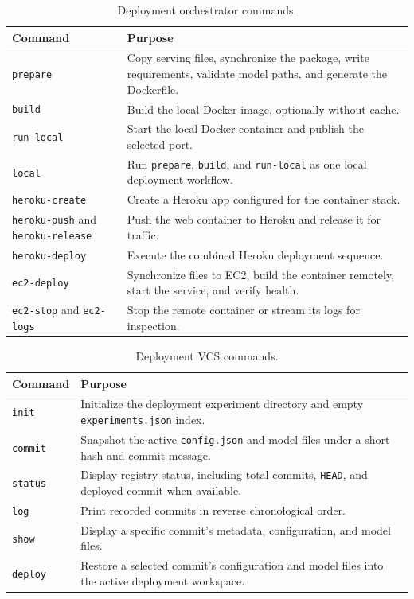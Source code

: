 \begin{table}[H]
\centering
\acceleraTableStyle
\caption{Deployment orchestrator commands.}
\label{tab:deployment_orchestrator_commands}
\begin{tabularx}{\textwidth}{p{}X}
\toprule
\textbf{Command} & \textbf{Purpose} \\
\midrule
\texttt{prepare} & Copy serving files, synchronize the package, write
requirements, validate model paths, and generate the Dockerfile. \\
\midrule
\texttt{build} & Build the local Docker image, optionally without cache. \\
\midrule
\texttt{run-local} & Start the local Docker container and publish the selected
port. \\
\midrule
\texttt{local} & Run \texttt{prepare}, \texttt{build}, and \texttt{run-local}
as one local deployment workflow. \\
\midrule
\texttt{heroku-create} & Create a Heroku app configured for the container
stack. \\
\midrule
\texttt{heroku-push} and \texttt{heroku-release} & Push the web container to
Heroku and release it for traffic. \\
\midrule
\texttt{heroku-deploy} & Execute the combined Heroku deployment sequence. \\
\midrule
\texttt{ec2-deploy} & Synchronize files to EC2, build the container remotely,
start the service, and verify health. \\
\midrule
\texttt{ec2-stop} and \texttt{ec2-logs} & Stop the remote container or stream
its logs for inspection. \\
\bottomrule
\end{tabularx}
\end{table}

\begin{table}[H]
\centering
\acceleraTableStyle
\caption{Deployment VCS commands.}
\label{tab:deployment_vcs_commands}
\begin{tabularx}{\textwidth}{p{}X}
\toprule
\textbf{Command} & \textbf{Purpose} \\
\midrule
\texttt{init} & Initialize the deployment experiment directory and empty
\texttt{experiments.json} index. \\
\midrule
\texttt{commit} & Snapshot the active \texttt{config.json} and model files
under a short hash and commit message. \\
\midrule
\texttt{status} & Display registry status, including total commits,
\texttt{HEAD}, and deployed commit when available. \\
\midrule
\texttt{log} & Print recorded commits in reverse chronological order. \\
\midrule
\texttt{show} & Display a specific commit's metadata, configuration, and model
files. \\
\midrule
\texttt{deploy} & Restore a selected commit's configuration and model files
into the active deployment workspace. \\
\bottomrule
\end{tabularx}
\end{table}


